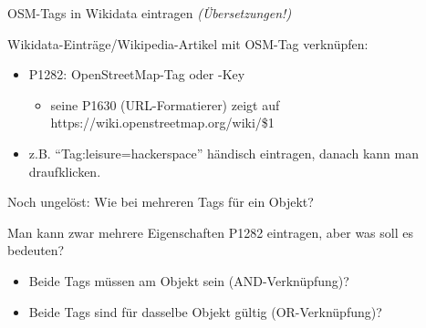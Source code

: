 \documentclass{beamer}
\begin{document}
\begin{frame}{OSM-Tags in Wikidata eintragen \emph{(Übersetzungen!)}}

Wikidata-Einträge/Wikipedia-Artikel mit OSM-Tag verknüpfen:

\begin{itemize}
  \item P1282: OpenStreetMap-Tag oder -Key
  \begin{itemize}
    \item seine P1630 (URL-Formatierer) zeigt auf https://wiki.openstreetmap.org/wiki/\$1
  \end{itemize}
  \item z.B. "`Tag:leisure=hackerspace"' händisch eintragen, danach kann man draufklicken.
\end{itemize}

\pause

Noch ungelöst: Wie bei mehreren Tags für ein Objekt?
 \vspace*{0.2cm}

Man kann zwar mehrere Eigenschaften P1282 eintragen, aber was soll es bedeuten?
\begin{itemize}
  \item Beide Tags müssen am Objekt sein (AND-Verknüpfung)?
  \item Beide Tags sind für dasselbe Objekt gültig (OR-Verknüpfung)?
\end{itemize}

\end{frame}



\end{document}
